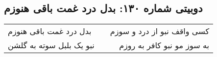 \begin{center}
\section*{دوبیتی شماره ۱۳۰: بدل درد غمت باقی هنوزم}
\label{sec:130}
\begin{longtable}{l p{0.5cm} r}
بدل درد غمت باقی هنوزم
&&
کسی واقف نبو از درد و سوزم
\\
نبو یک بلبل سوته به گلشن
&&
به سوز مو نبو کافر به روزم
\\
\end{longtable}
\end{center}
